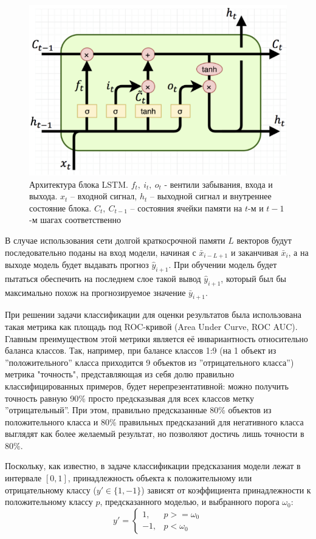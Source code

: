 \begin{figure}
  \centering
  \includegraphics[width=.75\linewidth]{images/lstm_arch.png}
  \caption{Архитектура блока LSTM. $f_t,\ i_t,\ o_t$ - вентили забывания, входа и выхода. $x_t$ -- входной сигнал, $h_t$ -- выходной сигнал и внутреннее состояние блока. $C_t,\ C_{t-1}$ -- состояния ячейки памяти на $t$-м и $t-1$-м шагах соответственно}
  \label{fig:lstm_arch}
\end{figure}


В случае использования сети долгой краткосрочной памяти $L$ векторов будут последовательно поданы на вход модели, начиная с  $\bar{x}_{i-L+1}$ и заканчивая $\bar{x}_{i}$, а на выходе модель будет выдавать прогноз $\hat{y}_{i+1}$. При обучении модель будет пытаться обеспечить на последнем слое такой вывод $\hat{y}_{i+1}$, который был бы максимально похож на прогнозируемое значение $\bar{y}_{i+1}$.

При решении задачи классификации для оценки результатов была использована такая метрика как площадь под ROC-кривой (Area Under Curve, ROC AUC). Главным преимуществом этой метрики является её инвариантность относительно баланса классов. Так, например, при балансе классов 1:9 (на 1 объект из ''положительного'' класса приходится 9 объектов из ''отрицательного класса'') метрика "точность", представляющая из себя долю правильно классифицированных примеров, будет нерепрезентативной: можно получить точность равную 90\% просто предсказывая для всех классов метку ''отрицательный''. При этом, правильно предсказанные 80\% объектов из положительного класса и 80\% правильных предсказаний для негативного класса выглядят как более желаемый результат, но позволяют достичь лишь точности в 80\%.

Поскольку, как известно, в задаче классификации предсказания модели лежат в интервале $[0, 1]$, принадлежность объекта к положительному или отрицательному классу ($y' \in \{1, -1\}$) зависят от коэффициента принадлежности к положительному классу $p$, предсказанного моделью, и выбранного порога $\omega_0$:
$$
y' =    \begin{cases}
			1, & p >= \omega_0\\
            -1, & p < \omega_0
	    \end{cases}
$$

